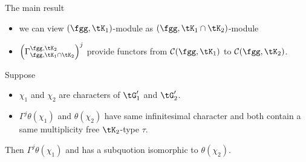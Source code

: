 \documentclass[final,hyperref={pdfpagelabels=false}]{beamer} %
\def\cR{{\mathcal{R}}}
\def\cC{\mathcal{C}}
\begin{document}
\begin{frame}
\begin{columns}[t]
\begin{column}{.48\linewidth}
\begin{block}{The main result}
\begin{itemize}
\begin{itemize}
        \item we can view $(\fgg, \tK_1)$-module 
          as $(\fgg, \tK_1\cap \tK_2)$-module
        \item $\left(\Gamma_{\fgg,\tK_1\cap \tK_2}^{\fgg,\tK_2}\right)^j$ provide functors 
          from $\cC(\fgg, \tK_1)$ to $\cC(\fgg,\tK_2)$.
        \end{itemize}
     \end{itemize}
     Suppose
     \begin{itemize}
        \item $\chi_1$ and $\chi_2$ are characters of $\tG'_1$ and $\tG'_2$.
      \item $\Gamma^j\theta(\chi_1)$ and  $\theta(\chi_2)$ 
        have same infinitesimal character
        and both contain a same multiplicity free $\tK_2$-type $\tau$.
      \end{itemize}
      Then 
      $\Gamma^j\theta(\chi_1)$ and 
      has a subquotion isomorphic to $\theta(\chi_2)$.
    \end{block}
    
\end{column}
\end{columns}
\end{frame}
\end{document}
